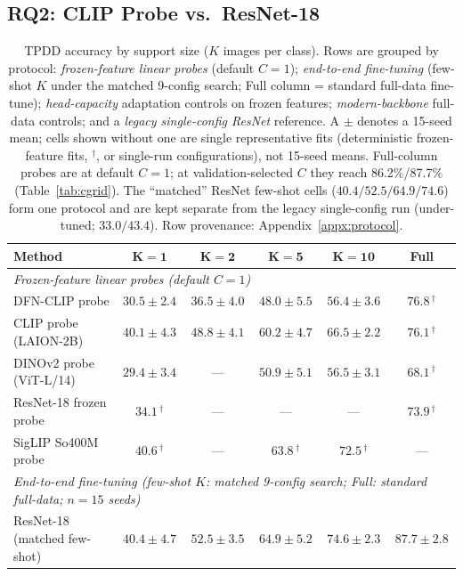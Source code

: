 \documentclass[10pt,a4paper]{article}
\begin{document}
\subsection{RQ2: CLIP Probe vs.\ ResNet-18}

\begin{table}[!ht]
\centering
\caption{TPDD accuracy by support size ($K$ images per class). Rows are grouped by protocol: \emph{frozen-feature linear probes} (default $C{=}1$); \emph{end-to-end fine-tuning} (few-shot $K$ under the matched 9-config search; Full column = standard full-data fine-tune); \emph{head-capacity} adaptation controls on frozen features; \emph{modern-backbone} full-data controls; and a \emph{legacy single-config ResNet} reference. A $\pm$ denotes a 15-seed mean; cells shown without one are single representative fits (deterministic frozen-feature fits, $^{\dagger}$, or single-run configurations), not 15-seed means. Full-column probes are at default $C{=}1$; at validation-selected $C$ they reach 86.2\%/87.7\% (Table~\ref{tab:cgrid}). The ``matched'' ResNet few-shot cells ($40.4/52.5/64.9/74.6$) form one protocol and are kept separate from the legacy single-config run (under-tuned; $33.0/43.4$). Row provenance: Appendix~\ref{appx:protocol}.}
\label{tab:main}
\begin{tabular}{lccccc}
\toprule
\textbf{Method} & $\boldsymbol{K=1}$ & $\boldsymbol{K=2}$ & $\boldsymbol{K=5}$ & $\boldsymbol{K=10}$ & \textbf{Full} \\
\midrule
\multicolumn{6}{l}{\emph{Frozen-feature linear probes (default $C{=}1$)}} \\
\midrule
DFN-CLIP probe          & $30.5 \pm 2.4$ & $36.5 \pm 4.0$ & $48.0 \pm 5.5$ & $56.4 \pm 3.6$ & $76.8\,^{\dagger}$ \\
CLIP probe (LAION-2B)   & $40.1 \pm 4.3$ & $48.8 \pm 4.1$ & $60.2 \pm 4.7$ & $66.5 \pm 2.2$ & $76.1\,^{\dagger}$ \\
DINOv2 probe (ViT-L/14) & $29.4 \pm 3.4$ & --- & $50.9 \pm 5.1$ & $56.5 \pm 3.1$ & $68.1\,^{\dagger}$ \\
ResNet-18 frozen probe  & $34.1\,^{\dagger}$ & --- & --- & --- & $73.9\,^{\dagger}$ \\
SigLIP So400M probe     & $40.6\,^{\dagger}$ & --- & $63.8\,^{\dagger}$ & $72.5\,^{\dagger}$ & --- \\
\midrule
\multicolumn{6}{l}{\emph{End-to-end fine-tuning (few-shot $K$: matched 9-config search; Full: standard full-data; $n{=}15$ seeds)}} \\
\midrule
ResNet-18 (matched few-shot) & $40.4 \pm 4.7$ & $52.5 \pm 3.5$ & $64.9 \pm 5.2$ & $74.6 \pm 2.3$ & $87.7 \pm 2.8$ \\

\end{tabular}
\end{table}
\end{document}
